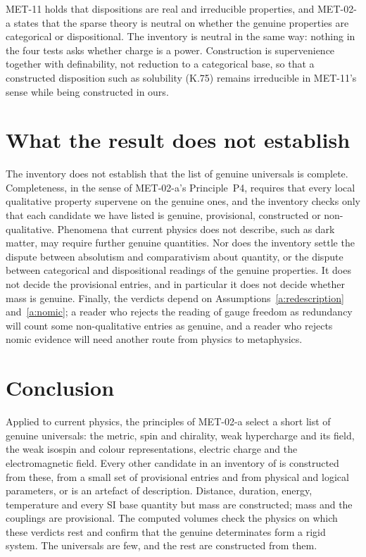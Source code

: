 \documentclass{situationist-preprint}
\begin{document}
\begin{reply}
MET-11 holds that dispositions are real and irreducible properties, and MET-02-a states that the sparse theory is neutral on whether the genuine properties are categorical or dispositional. The inventory is neutral in the same way: nothing in the four tests asks whether charge is a power. Construction is supervenience together with definability, not reduction to a categorical base, so that a constructed disposition such as solubility (K.75) remains irreducible in MET-11's sense while being constructed in ours.
\end{reply}

\section{What the result does not establish}\label{s:limits}

The inventory does not establish that the list of genuine universals is complete. Completeness, in the sense of MET-02-a's Principle~P4, requires that every local qualitative property supervene on the genuine ones, and the inventory checks only that each candidate we have listed is genuine, provisional, constructed or non-qualitative. Phenomena that current physics does not describe, such as dark matter, may require further genuine quantities. Nor does the inventory settle the dispute between absolutism and comparativism about quantity, or the dispute between categorical and dispositional readings of the genuine properties. It does not decide the provisional entries, and in particular it does not decide whether mass is genuine. Finally, the verdicts depend on Assumptions~\ref{a:redescription} and~\ref{a:nomic}; a reader who rejects the reading of gauge freedom as redundancy will count some non-qualitative entries as genuine, and a reader who rejects nomic evidence will need another route from physics to metaphysics.

\section{Conclusion}

Applied to current physics, the principles of MET-02-a select a short list of genuine universals: the metric, spin and chirality, weak hypercharge and its field, the weak isospin and colour representations, electric charge and the electromagnetic field. Every other candidate in an inventory of \vvNK{} is constructed from these, from a small set of provisional entries and from physical and logical parameters, or is an artefact of description. Distance, duration, energy, temperature and every SI base quantity but mass are constructed; mass and the couplings are provisional. The computed volumes check the physics on which these verdicts rest and confirm that the genuine determinates form a rigid system. The universals are few, and the rest are constructed from them.
\end{document}

